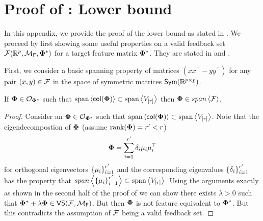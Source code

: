 \newpage

\section{Proof of : Lower bound}\label{app: constlb}
In this appendix, we provide the proof of the lower bound as stated in . We proceed by first showing some useful properties on a valid feedback set ${\mathcal{F}}(\mathbb{R}^p,{\mathcal{M}}_{\textsf{F}}, \boldsymbol{\Phi}^*)$ for a target feature matrix $\boldsymbol{\Phi}^*$. They are stated in  and .

First, we consider a basic spanning property of matrices $(xx^\top - yy^\top)$ for any pair $(x,y) \in {\mathcal{F}}$ in the space of symmetric matrices $\textsf{Sym}(\mathbb{R}^{p\times p})$.

\begin{lemma}\label{lem: inclusion}
    If $\boldsymbol{\Phi} \in \mathcal{O}_{\boldsymbol{\Phi}^*}$ such that $\text{span}\left<\textsf{col}({\boldsymbol{\Phi}})\right> \subset \text{span}\left<V_{\left[r\right]}\right>$ then $\boldsymbol{\Phi} \in span \left<{\mathcal{F}}\right>$.
\end{lemma}
\begin{proof}
     Consider an $\boldsymbol{\Phi} \in \mathcal{O}_{\boldsymbol{\Phi}^*}$ such that $\text{span}\left<\textsf{col}({\boldsymbol{\Phi}})\right> \subset \text{span}\left<V_{\left[r\right]}\right>$. Note that the eigendecompostion of $\boldsymbol{\Phi}$ (assume $\text{rank}({\boldsymbol{\Phi}}) = r' < r$)
     \begin{align*}
         \boldsymbol{\Phi} = \sum_{i = 1}^{r'} \delta_i\mu_i\mu_i^{\top}
     \end{align*}
     for orthogonal eigenvectors $\left\{\mu_i\right\}_{i=1}^{r'}$ and the corresponding eigenvalues $\left\{\delta_i\right\}_{i=1}^{r'}$ has the property that $span \left<\left\{\mu_i\right\}_{i=1}^{r'}\right> \subset \text{span} \left<V_{\left[r\right]}\right>$. Using the arguments exactly as shown in the second half of the proof of  we can show there exists $\lambda > 0$ such that $\boldsymbol{\Phi}^* + \lambda \boldsymbol{\Phi} \in \textsf{VS}({\mathcal{F}}, {\mathcal{M}}_{\textsf{F}})$. But then $\boldsymbol{\Phi}$ is not feature equivalent to $\boldsymbol{\Phi}^*$. But this contradicts the assumption of ${\mathcal{F}}$ being a valid feedback set. 
\end{proof}


